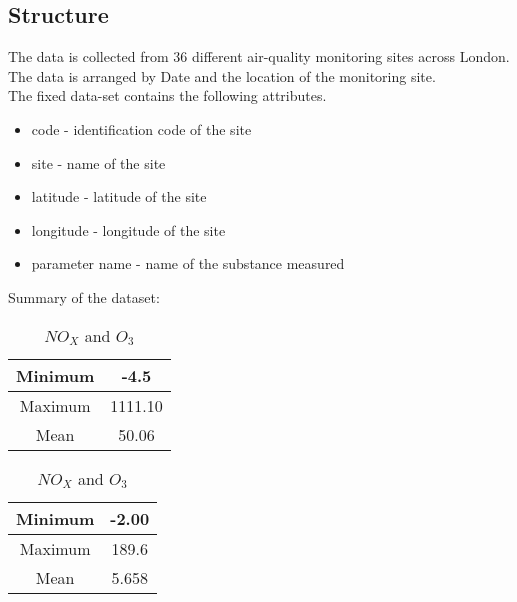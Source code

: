 \documentclass{article}
\begin{document}
	\subsection{Structure}
	
	The data is collected from 36 different air-quality monitoring sites across London. The data is arranged by Date and the location of the monitoring site.\\
	The fixed data-set contains the following attributes.
	
	\begin{itemize}
		\item code - identification code of the site
		\item site - name of the site
		\item latitude - latitude of the site
		\item longitude - longitude of the site
		\item parameter name - name of the substance measured
	\end{itemize}
	Summary of the dataset:
	
	\begin{table}[h]
		\centering
		\begin{minipage}{.5\textwidth}
			\centering
			\begin{tabular}{|c|c|}
				\hline
				Minimum & -4.5 \\
				\hline
				Maximum & 1111.10 \\
				\hline
				Mean & 50.06 \\
				\hline
			\end{tabular}
			\caption{$NO_X$ and $O_3$}
			\label{table_nox}
		\end{minipage}%
		\begin{minipage}{.5\textwidth}
			\centering
			\begin{tabular}{|c|c|}
				\hline
				Minimum & -2.00 \\
				\hline
				Maximum & 189.6 \\
				\hline
				Mean & 5.658 \\
				\hline
			\end{tabular}
			\label{table_o3}
		\end{minipage}
	\end{table}
	
\end{document}
